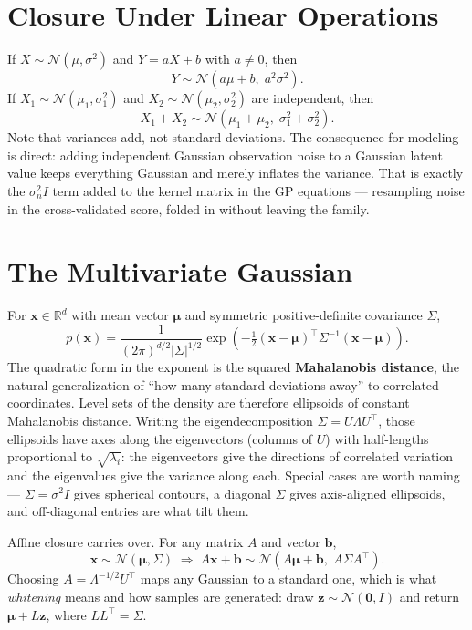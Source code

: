 \documentclass[conference]{IEEEtran}
\begin{document}
\section*{Closure Under Linear Operations}
If $X \sim \mathcal{N}(\mu, \sigma^2)$ and $Y = aX + b$ with $a \neq 0$, then
\begin{equation}
    Y \sim \mathcal{N}\!\left(a\mu + b,\; a^2\sigma^2\right).
\end{equation}
If $X_1 \sim \mathcal{N}(\mu_1,\sigma_1^2)$ and $X_2 \sim \mathcal{N}(\mu_2,\sigma_2^2)$ are independent, then
\begin{equation}
    X_1 + X_2 \sim \mathcal{N}\!\left(\mu_1 + \mu_2,\; \sigma_1^2 + \sigma_2^2\right).
\end{equation}
Note that variances add, not standard deviations. The consequence for modeling is direct: adding independent Gaussian observation noise to a Gaussian latent value keeps everything Gaussian and merely inflates the variance. That is exactly the $\sigma_n^2 I$ term added to the kernel matrix in the GP equations --- resampling noise in the cross-validated score, folded in without leaving the family.

\section*{The Multivariate Gaussian}
For $\mathbf{x} \in \mathbb{R}^d$ with mean vector $\boldsymbol{\mu}$ and symmetric positive-definite covariance $\Sigma$,
\begin{equation}
    p(\mathbf{x}) = \frac{1}{(2\pi)^{d/2}|\Sigma|^{1/2}}
    \exp\!\left(-\tfrac{1}{2}(\mathbf{x}-\boldsymbol{\mu})^{\!\top}\Sigma^{-1}(\mathbf{x}-\boldsymbol{\mu})\right).
\end{equation}
The quadratic form in the exponent is the squared \textbf{Mahalanobis distance}, the natural generalization of ``how many standard deviations away'' to correlated coordinates. Level sets of the density are therefore ellipsoids of constant Mahalanobis distance. Writing the eigendecomposition $\Sigma = U\Lambda U^{\!\top}$, those ellipsoids have axes along the eigenvectors (columns of $U$) with half-lengths proportional to $\sqrt{\lambda_i}$: the eigenvectors give the directions of correlated variation and the eigenvalues give the variance along each. Special cases are worth naming --- $\Sigma = \sigma^2 I$ gives spherical contours, a diagonal $\Sigma$ gives axis-aligned ellipsoids, and off-diagonal entries are what tilt them.

Affine closure carries over. For any matrix $A$ and vector $\mathbf{b}$,
\begin{equation}
    \mathbf{x} \sim \mathcal{N}(\boldsymbol{\mu},\Sigma)
    \;\Longrightarrow\;
    A\mathbf{x} + \mathbf{b} \sim \mathcal{N}\!\left(A\boldsymbol{\mu} + \mathbf{b},\; A\Sigma A^{\!\top}\right).
\end{equation}
Choosing $A = \Lambda^{-1/2}U^{\!\top}$ maps any Gaussian to a standard one, which is what \textit{whitening} means and how samples are generated: draw $\mathbf{z} \sim \mathcal{N}(\mathbf{0},I)$ and return $\boldsymbol{\mu} + L\mathbf{z}$, where $LL^{\!\top} = \Sigma$.
\end{document}
